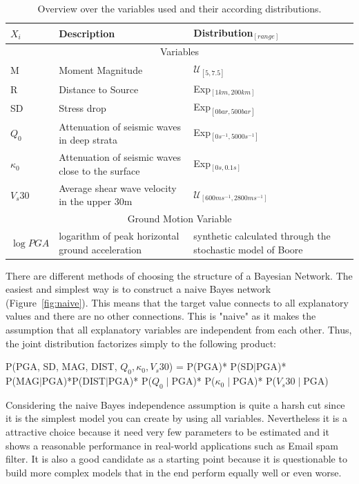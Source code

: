 \begin{table}[h]
\begin{tabular}{ p{3cm}p{5cm}p{5cm}  }
\hline
 $X_i$ & Description & Distribution$_{[range]}$\\
 \hline 
 \hline
 \multicolumn{3}{c}{Variables} \\
 \hline
 M   & Moment Magnitude    &$\mathcal{U}_{[5,7.5]}$\\
 R&   Distance to Source  & Exp$_{[1 km, 200km]}$\\
 SD & Stress drop & Exp$_{[0 bar, 500bar]}$\\
 $Q_0$    &Attenuation of seismic waves in deep strata &  Exp$_{[0 s^{-1}, 5000 s^{-1}]}$\\
 $\kappa_0$&   Attenuation of seismic waves close to the surface  &  Exp$_{[0 s, 0.1 s]}$\\
 $V_s30$& Average shear wave velocity in the upper 30m  & $\mathcal{U}_{[600 m s^{-1}, 2800 m s^{-1}]}$\\
 \hline
 \multicolumn{3}{c}{Ground Motion Variable} \\
 \hline
 $\log PGA$& logarithm of peak horizontal ground acceleration  & synthetic calculated through the stochastic model of Boore \citep{boore2003}\\
 \hline
\end{tabular}
\caption[Variables and distributions]{Overview over the variables used and their according distributions.}
\label{tab:1}
\end{table}

\newpage
There are different methods of choosing the structure of a Bayesian Network. The easiest and simplest way is to construct a naive Bayes network (Figure~\ref{fig:naive}). This means that the target value connects to all explanatory values and there are no other connections. This is "naive" as it makes the assumption that all explanatory variables are independent from each other. Thus, the joint distribution factorizes simply to the following product:
\begin{center}
\small
P(PGA, SD, MAG, DIST, $Q_0, \kappa_0, V_s30$) = P(PGA)* P(SD$\mid$PGA)* \\P(MAG$\mid$PGA)*P(DIST$\mid$PGA)* P($Q_0\mid$PGA)* P($\kappa_0\mid$PGA)* P($V_s30\mid$PGA)\\
\normalsize
\end{center}
Considering the naive Bayes independence assumption is quite a harsh cut since it is the simplest model you can create by using all variables. Nevertheless it is a attractive choice because it need very few parameters to be estimated and it shows a reasonable performance in real-world applications such as Email spam filter. It is also a good candidate as a starting point because it is questionable to build more complex models that in the end perform equally well or even worse.   

